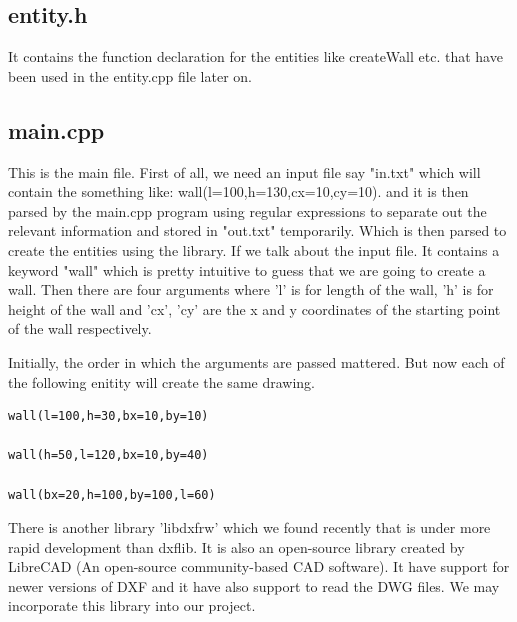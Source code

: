 \subsection*{entity.h}
It contains the function declaration for the entities like createWall etc. that have been used in the entity.cpp file later on.


\subsection*{main.cpp}
This is the main file. First of all, we need an input file say "in.txt" which will contain the something like:
wall(l=100,h=130,cx=10,cy=10). and it is then parsed by the main.cpp program using regular expressions to separate out the relevant information and stored in "out.txt" temporarily. Which is then parsed to create the entities using the library. If we talk about the input file. It contains a keyword "wall" which is pretty intuitive to guess that we are going to create a wall. Then there are four arguments where 'l' is for length of the wall, 'h' is for height of the wall and 'cx', 'cy' are the x and y coordinates of the starting point of the wall respectively.

Initially, the order in which the arguments are passed mattered. But now each of the following enitity will create the same drawing.
\begin{lstlisting}
wall(l=100,h=30,bx=10,by=10)

wall(h=50,l=120,bx=10,by=40)

wall(bx=20,h=100,by=100,l=60)
\end{lstlisting}


There is another library 'libdxfrw' which we found recently that is under more rapid development than dxflib. It is also an open-source library created by LibreCAD (An open-source community-based CAD software). It have support for newer versions of DXF and it have also support to read the DWG files. We may incorporate this library into our project.